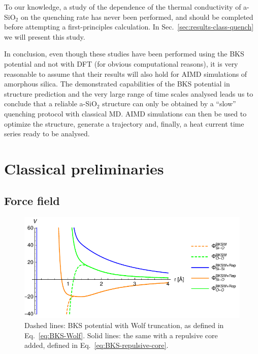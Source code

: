 \medskip
To our knowledge, a study of the dependence of the thermal conductivity of a-SiO$_2$ on the quenching rate has never been performed, and should be completed before attempting a first-principles calculation. In Sec.~\ref{sec:results-class-quench} we will present this study. 

In conclusion, even though these studies have been performed using the BKS potential and not with DFT (for obvious computational reasons), it is very reasonable to assume that their results will also hold for AIMD simulations of amorphous silica. 
The demonstrated capabilities of the BKS potential in structure prediction and the very large range of time scales analysed leads us to conclude that a reliable a-SiO$_2$ structure can only be obtained by a ``slow'' quenching protocol with classical MD. 
AIMD simulations can then be used to optimize the structure, generate a trajectory and, finally, a heat current time series ready to be analysed. 



\section{Classical preliminaries}  \label{sec:results-classical}

\subsection{Force field}  \label{sec:results-class-force-field}
\begin{figure}[!tb]
    \centering
    \includegraphics[]{chapters/chapter6/figures/BKSW.pdf}
    \caption{Dashed lines: BKS potential with Wolf truncation, as defined in Eq.~\eqref{eq:BKS-Wolf}. Solid lines: the same with a repulsive core added, defined in Eq.~\eqref{eq:BKS-repulsive-core}.}
    \label{fig:BKS-potential}
\end{figure}

